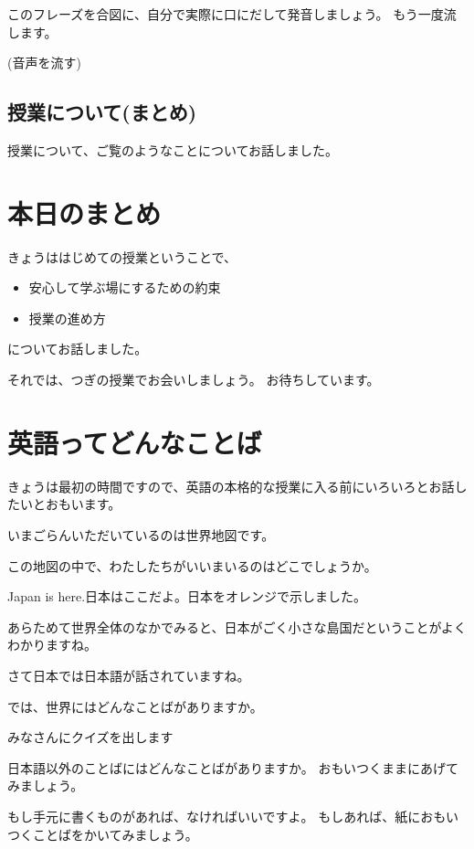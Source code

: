 \documentclass[12pt]{jlreq}
\begin{document}
このフレーズを合図に、自分で実際に口にだして発音しましょう。
もう一度流します。

(音声を流す)


\subsection{授業について(まとめ)}
授業について、ご覧のようなことについてお話しました。

\section{本日のまとめ}

きょうははじめての授業ということで、
\begin{itemize}
\item  安心して学ぶ場にするための約束
\item  授業の進め方
\end{itemize}
についてお話しました。

それでは、つぎの授業でお会いしましょう。
お待ちしています。
\newpage
\section{英語ってどんなことば}

\hrulefill

きょうは最初の時間ですので、英語の本格的な授業に入る前にいろいろとお話したいとおもいます。

いまごらんいただいているのは世界地図です。

この地図の中で、わたしたちがいいまいるのはどこでしょうか。

\hrulefill

Japan is here.日本はここだよ。日本をオレンジで示しました。

あらためて世界全体のなかでみると、日本がごく小さな島国だということがよくわかりますね。

\hrulefill

さて日本では日本語が話されていますね。

では、世界にはどんなことばがありますか。

\hrulefill

みなさんにクイズを出します

日本語以外のことばにはどんなことばがありますか。
おもいつくままにあげてみましょう。

もし手元に書くものがあれば、なければいいですよ。
もしあれば、紙におもいつくことばをかいてみましょう。
\end{document}
